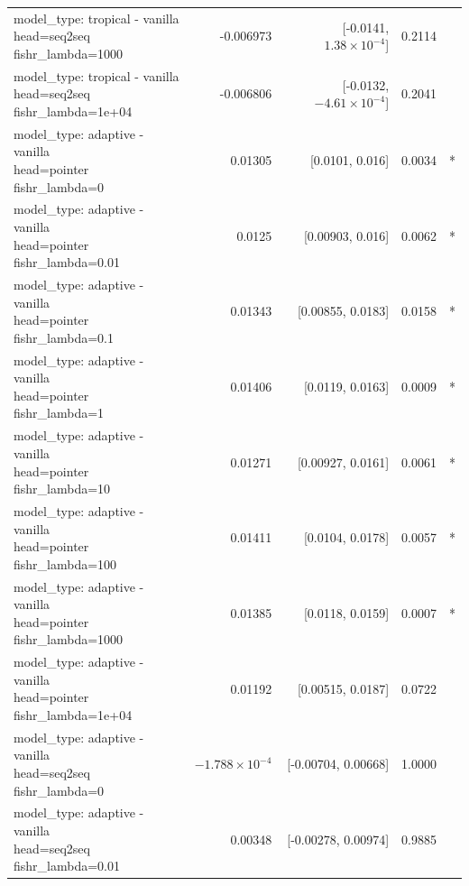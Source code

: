 \documentclass[10pt]{article}
\makeatletter
\newcommand{\stackcell}[1]{\begin{tabular}[t]{@{}l@{}}#1\end{tabular}}
\makeatother
\begin{document}
{\begin{longtable}{lrrrl}
\stackcell{model\_type: tropical - vanilla\\\footnotesize head=seq2seq fishr\_lambda=1000 } & -0.006973 & [-0.0141, $1.38\times10^{-4}$] & 0.2114 & \\
\stackcell{model\_type: tropical - vanilla\\\footnotesize head=seq2seq fishr\_lambda=1e+04 } & -0.006806 & [-0.0132, $-4.61\times10^{-4}$] & 0.2041 & \\
\stackcell{model\_type: adaptive - vanilla\\\footnotesize head=pointer fishr\_lambda=0 } & 0.01305 & [0.0101, 0.016] & 0.0034 & *\\
\stackcell{model\_type: adaptive - vanilla\\\footnotesize head=pointer fishr\_lambda=0.01 } & 0.0125 & [0.00903, 0.016] & 0.0062 & *\\
\stackcell{model\_type: adaptive - vanilla\\\footnotesize head=pointer fishr\_lambda=0.1 } & 0.01343 & [0.00855, 0.0183] & 0.0158 & *\\
\stackcell{model\_type: adaptive - vanilla\\\footnotesize head=pointer fishr\_lambda=1 } & 0.01406 & [0.0119, 0.0163] & 0.0009 & *\\
\stackcell{model\_type: adaptive - vanilla\\\footnotesize head=pointer fishr\_lambda=10 } & 0.01271 & [0.00927, 0.0161] & 0.0061 & *\\
\stackcell{model\_type: adaptive - vanilla\\\footnotesize head=pointer fishr\_lambda=100 } & 0.01411 & [0.0104, 0.0178] & 0.0057 & *\\
\stackcell{model\_type: adaptive - vanilla\\\footnotesize head=pointer fishr\_lambda=1000 } & 0.01385 & [0.0118, 0.0159] & 0.0007 & *\\
\stackcell{model\_type: adaptive - vanilla\\\footnotesize head=pointer fishr\_lambda=1e+04 } & 0.01192 & [0.00515, 0.0187] & 0.0722 & \\
\stackcell{model\_type: adaptive - vanilla\\\footnotesize head=seq2seq fishr\_lambda=0 } & $-1.788\times10^{-4}$ & [-0.00704, 0.00668] & 1.0000 & \\
\stackcell{model\_type: adaptive - vanilla\\\footnotesize head=seq2seq fishr\_lambda=0.01 } & 0.00348 & [-0.00278, 0.00974] & 0.9885 & \\

\end{longtable}}
\end{document}
